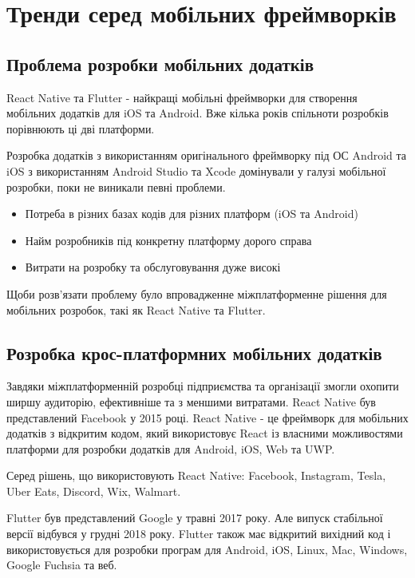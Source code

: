 \newpage

\renewcommand{\proofname}{Доведення}
\renewcommand{\chaptername}{РОЗДІЛ}
\chapter{Тренди серед мобільних фреймворків}
\label{ch1}

\section{Проблема розробки мобільних додатків}
\label{section.1.1}

React Native та Flutter - найкращі мобільні фреймворки для створення мобільних додатків для iOS та Android.
Вже кілька років спільноти розробків порівнюють ці дві платформи.

Розробка додатків з використанням оригінального фреймворку під ОС Android та iOS з використанням Android Studio та Xcode домінували у галузі мобільної розробки, поки не виникали певні проблеми.
\begin{itemize}
    \item Потреба в різних базах кодів для різних платформ (iOS та Android)
    \item Найм розробників під конкретну платформу дорого справа
    \item Витрати на розробку та обслуговування дуже високі
\end{itemize}

Щоби розв'язати проблему було впровадженне міжплатформенне рішення для мобільних розробок, такі як React Native та Flutter.

\section{Розробка крос-платформних мобільних додатків}
\label{section.1.2}
Завдяки міжплатформенній розробці підприємства та організації змогли охопити ширшу аудиторію, ефективніше та з меншими витратами.
React Native був представлений Facebook у 2015 році.
React Native - це фреймворк для мобільних додатків з відкритим кодом, який використовує React із власними можливостями платформи для розробки додатків для Android, iOS, Web та UWP.

Серед рішень, що використовують React Native: Facebook, Instagram, Tesla, Uber Eats, Discord, Wix, Walmart.

Flutter був представлений Google у травні 2017 року. Але випуск стабільної версії відбувся у грудні 2018 року.
Flutter також має відкритий вихідний код і використовується для розробки програм для Android, iOS, Linux, Mac, Windows, Google Fuchsia та веб.


